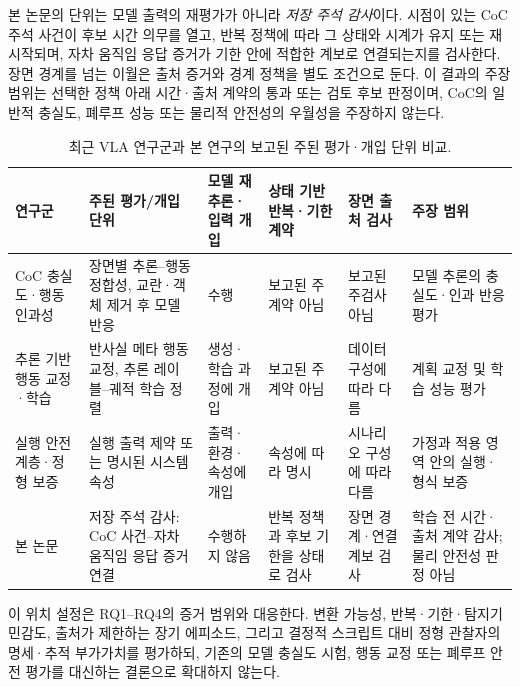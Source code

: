 본 논문의 단위는 모델 출력의 재평가가 아니라 \emph{저장 주석 감사}이다. 시점이 있는 CoC 주석 사건이 후보 시간 의무를 열고, 반복 정책에 따라 그 상태와 시계가 유지 또는 재시작되며, 자차 움직임 응답 증거가 기한 안에 적합한 계보로 연결되는지를 검사한다. 장면 경계를 넘는 이월은 출처 증거와 경계 정책을 별도 조건으로 둔다. 이 결과의 주장 범위는 선택한 정책 아래 시간·출처 계약의 통과 또는 검토 후보 판정이며, CoC의 일반적 충실도, 폐루프 성능 또는 물리적 안전성의 우월성을 주장하지 않는다.

\begin{table}[t]
\centering
\caption{최근 VLA 연구군과 본 연구의 보고된 주된 평가·개입 단위 비교.}
\label{tab:related-position}
\scriptsize
\setlength{\tabcolsep}{3pt}
\begin{tabularx}{\textwidth}{L{0.135\textwidth}L{0.185\textwidth}L{0.145\textwidth}L{0.145\textwidth}L{0.12\textwidth}Y}
\toprule
연구군 & 주된 평가/개입 단위 & 모델 재추론·입력 개입 & 상태 기반 반복·기한 계약 & 장면 출처 검사 & 주장 범위 \\
\midrule
CoC 충실도·행동 인과성 \cite{mayumu2026faithfulness,nguyen2026vladrivebench,priyadershi2026lostinfog,panda2026cvaa} & 장면별 추론--행동 정합성, 교란·객체 제거 후 모델 반응 & 수행 & 보고된 주계약 아님 & 보고된 주검사 아님 & 모델 추론의 충실도·인과 반응 평가 \\
추론 기반 행동 교정·학습 \cite{peng2025counterfactualvla,tian2026ccot,jiang2026workdrive} & 반사실 메타 행동 교정, 추론 레이블--궤적 학습 정렬 & 생성·학습 과정에 개입 & 보고된 주계약 아님 & 데이터 구성에 따라 다름 & 계획 교정 및 학습 성능 평가 \\
실행 안전 계층·정형 보증 \cite{hu2025vlsa,behrmann2004uppaal,donze2010robustness,shalev2017rss} & 실행 출력 제약 또는 명시된 시스템 속성 & 출력·환경·속성에 개입 & 속성에 따라 명시 & 시나리오 구성에 따라 다름 & 가정과 적용 영역 안의 실행·형식 보증 \\
본 논문 & 저장 주석 감사: CoC 사건--자차 움직임 응답 증거 연결 & 수행하지 않음 & 반복 정책과 후보 기한을 상태로 검사 & 장면 경계·연결 계보 검사 & 학습 전 시간·출처 계약 감사; 물리 안전성 판정 아님 \\
\bottomrule
\end{tabularx}
\end{table}

이 위치 설정은 RQ1--RQ4의 증거 범위와 대응한다. 변환 가능성, 반복·기한·탐지기 민감도, 출처가 제한하는 장기 에피소드, 그리고 결정적 스크립트 대비 정형 관찰자의 명세·추적 부가가치를 평가하되, 기존의 모델 충실도 시험, 행동 교정 또는 폐루프 안전 평가를 대신하는 결론으로 확대하지 않는다.
